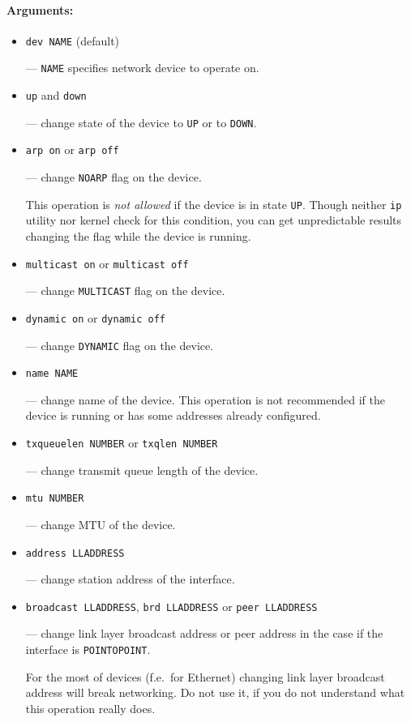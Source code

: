 \paragraph{Arguments:}

\begin{itemize}
\item \verb|dev NAME| (default)

--- \verb|NAME| specifies network device to operate on.

\item \verb|up| and \verb|down|

--- change state of the device to \verb|UP| or to \verb|DOWN|.

\item \verb|arp on| or \verb|arp off|

--- change \verb|NOARP| flag on the device.

\begin{NB}
This operation is {\em not allowed\/} if the device is in state \verb|UP|.
Though neither \verb|ip| utility nor kernel check for this condition,
you can get unpredictable results changing the flag while the
device is running.
\end{NB}

\item \verb|multicast on| or \verb|multicast off|

--- change \verb|MULTICAST| flag on the device.

\item \verb|dynamic on| or \verb|dynamic off|

--- change \verb|DYNAMIC| flag on the device.

\item \verb|name NAME|

--- change name of the device. This operation is not
recommended if the device is running or has some addresses
already configured.

\item \verb|txqueuelen NUMBER| or \verb|txqlen NUMBER|

--- change transmit queue length of the device.

\item \verb|mtu NUMBER|

--- change MTU of the device.

\item \verb|address LLADDRESS|

--- change station address of the interface.

\item \verb|broadcast LLADDRESS|, \verb|brd LLADDRESS| or \verb|peer LLADDRESS|

--- change link layer broadcast address or peer address in the case
if the interface is \verb|POINTOPOINT|.

\vskip 1mm
\begin{NB}
For the most of devices (f.e.\ for Ethernet) changing link layer
broadcast address will break networking.
Do not use it, if you do not understand what this operation really does.
\end{NB}

\end{itemize}

